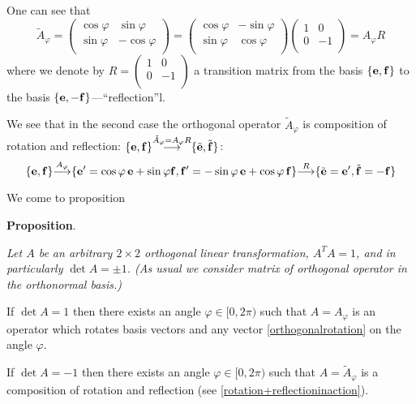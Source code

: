 \documentclass[12pt]{article}
\numberwithin{equation}{section}
\begin{document}
{\footnotesize

One can see that
                  \begin{equation}\label{secondcase-rotation}
    \tilde A_\varphi=\begin{pmatrix}
      \cos\varphi & \sin\varphi \\
      \sin\varphi & -\cos\varphi\\
       \end{pmatrix}=\begin{pmatrix}
      \cos\varphi & -\sin\varphi \\
      \sin\varphi & \cos\varphi\\
       \end{pmatrix}\begin{pmatrix}
      1 & 0 \\
      0 & -1\\
       \end{pmatrix}=A_\varphi R
\end{equation}
where we denote by $R=\begin{pmatrix}
      1 & 0 \\
      0 & -1\\
       \end{pmatrix}$ a transition matrix from the basis $\{{\bf e},{\bf f}\}$ to the basis $\{{\bf e},-{\bf f}\}$---``reflection''l.


       We see that in the second case the orthogonal  operator
  $\tilde A_\varphi$
is composition of rotation and reflection:
       $ \{\e,\f\}{\buildrel \tilde A_\varphi=A_\varphi R\over \longrightarrow}\{\tilde \e,\tilde \f\}$:
                           \begin{equation}\label{rotation+reflectioninaction}
    \{\e,\f\}{\buildrel A_\varphi\over \longrightarrow}
    \{\e'=\cos\varphi \,\e+\sin\varphi \f,\f'=-\sin\varphi\, \e+\cos\varphi \,\f\}
    {\buildrel R\over \longrightarrow}\{\tilde \e=\e',\tilde \f=-\f\}
\end{equation}


}

  We come to proposition
        







\m

        {\bf Proposition}\label{rotationindimensiontwo}. 
{\it Let $A$ be an arbitrary 
$2\times 2$ orthogonal linear transformation, $A^TA=1$,
        and in particularly $\det A=\pm 1$. 
(As usual we consider matrix of orthogonal operator 
in the orthonormal basis.)

         If $\det A=1$
      then there exists an angle $\varphi\in [0,2\pi)$ such that
      $A=A_\varphi$ is an operator which rotates basis vectors
and any vector \eqref{orthogonalrotation}
     on the  angle  $\varphi$.

      If $\det A=-1$ then there exists an angle $\varphi\in [0,2\pi)$ 
such that $A=\tilde A_\varphi$
      is a composition of rotation and 
reflection (see \eqref{rotation+reflectioninaction}).}
\end{document}
